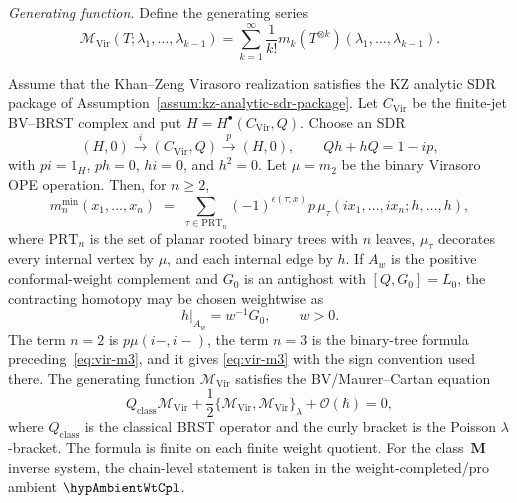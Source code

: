 \medskip
\noindent\emph{Generating function.}
Define the generating series
\begin{equation}
\label{eq:vir-gen-func}
\mathcal{M}_{\text{Vir}}(T; \lambda_1, \ldots, \lambda_{k-1}) = \sum_{k=1}^\infty \frac{1}{k!} m_k(T^{\otimes k})(\lambda_1, \ldots, \lambda_{k-1}).
\end{equation}

\begin{theorem}
\label{thm:vir-recursive}
Assume that the Khan--Zeng Virasoro realization satisfies the KZ
analytic SDR package of
Assumption~\textup{\ref{assum:kz-analytic-sdr-package}}.
Let $C_{\mathrm{Vir}}$ be the finite-jet BV--BRST complex and put
$H=H^\bullet(C_{\mathrm{Vir}},Q)$. Choose an SDR
\[
(H,0)\xrightarrow{\ i\ } (C_{\mathrm{Vir}},Q)
\xrightarrow{\ p\ }(H,0),
\qquad
Qh+hQ=1-ip,
\]
with $pi=1_H$, $ph=0$, $hi=0$, and $h^2=0$. Let
$\mu=m_2$ be the binary Virasoro OPE operation. Then, for $n\ge2$,
\begin{equation}
\label{eq:vir-hpl-transfer}
m_n^{\min}(x_1,\ldots,x_n)
\;=\;
\sum_{\tau\in \mathrm{PRT}_n}
(-1)^{\epsilon(\tau;x)}
p\,\mu_\tau(i x_1,\ldots,i x_n;h,\ldots,h),
\end{equation}
where $\mathrm{PRT}_n$ is the set of planar rooted binary trees with
$n$ leaves, $\mu_\tau$ decorates every internal vertex by $\mu$, and
each internal edge by $h$. If $A_w$ is the positive conformal-weight
complement and $G_0$ is an antighost with $[Q,G_0]=L_0$, the contracting
homotopy may be chosen weightwise as
\begin{equation}
\label{eq:vir-hpl-g0-over-weight}
h|_{A_w}=w^{-1}G_0,\qquad w>0.
\end{equation}
The term $n=2$ is $p\mu(i-,i-)$, the term $n=3$ is the binary-tree
formula preceding~\eqref{eq:vir-m3}, and it gives
\eqref{eq:vir-m3} with the sign convention used there. The generating
function $\mathcal{M}_{\text{Vir}}$ satisfies the BV/Maurer--Cartan
equation
\begin{equation}
Q_{\text{class}} \mathcal{M}_{\text{Vir}} + \frac{1}{2} \{\mathcal{M}_{\text{Vir}}, \mathcal{M}_{\text{Vir}}\}_\lambda + \mathcal{O}(\hbar)=0,
\end{equation}
where $Q_{\text{class}}$ is the classical BRST operator and the curly
bracket is the Poisson $\lambda$-bracket. The formula is finite on each
finite weight quotient. For the class~$\mathbf{M}$ inverse system, the
chain-level statement is taken in the weight-completed/pro ambient
$\hypAmbientWtCpl$.
\end{theorem}

